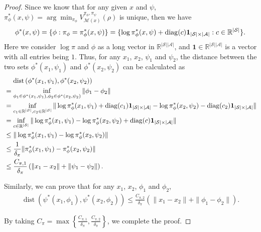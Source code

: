 \documentclass{article}
\theoremstyle{plain}
\theoremstyle{definition}
\theoremstyle{remark}
\DeclareMathOperator{\dist}{dist}
\def\R{\mathbb R}
\def\cA{\mathcal A}
\def\cM{\mathcal M}
\def\cS{\mathcal S}
\DeclareMathOperator{\diag}{diag}
\begin{document}
\begin{proof}
    Since we know that for any given $x$ and $\psi$, $\pi_\phi^*(x,\psi) = \arg\min_{\pi_\phi} V^{\pi_\phi,\pi_\psi}_{\cM(x)}(\rho)$ is unique, then we have
    \begin{align}
        \phi^*(x,\psi) = \{\phi: \pi_\phi = \pi_\phi^*(x,\psi) \} = \{\log \pi_\phi^*(x,\psi) + 
        \diag(c) \mathbf{1}_{|\cS| \times |\cA|}: c\in \R^{|\cS|}\}. \notag
    \end{align}
    Here we consider $\log \pi$ and $\phi$ as a long vector in $\R^{|\cS||\cA|}$, and $\mathbf{1} \in \R^{|\cS||\cA|}$ is a vector with all entries being $1$.
    Thus, for any $x_1$, $x_2$, $\psi_1$ and $\psi_2$, the distance between the two sets $\phi^*(x_1,\psi_1)$ and $\phi^*(x_2,\psi_2)$ can be calculated as
    \begin{align}
        & \quad \, \dist \left(\phi^*(x_1,\psi_1), \phi^*(x_2,\psi_2)\right) \notag \\
        & = \inf_{\phi_1 \in \phi^*(x_1,\psi_1), \phi_2 \in \phi^*(x_2,\psi_2)} \| \phi_1 - \phi_2 \| \notag\\
        & = \inf_{c_1 \in \R^{|\cS|}, c_2 \in \R^{|\cS|}} \| \log \pi_\phi^*(x_1,\psi_1) + \diag(c_1) \mathbf{1}_{|\cS| \times |\cA|} - \log \pi_\phi^*(x_2,\psi_2) - \diag(c_2) \mathbf{1}_{|\cS| \times |\cA|} \| \notag\\
        & = \inf_{c \in \R^{|\cS|}} \| \log \pi_\phi^*(x_1,\psi_1) - \log \pi_\phi^*(x_2,\psi_2) + \diag(c) \mathbf{1}_{|\cS| \times |\cA|} \| \notag\\
        & \leq \| \log \pi_\phi^*(x_1,\psi_1) - \log \pi_\phi^*(x_2,\psi_2) \| \notag\\
        & \leq \frac{1}{\delta_\pi} \| \pi_\phi^*(x_1,\psi_1) - \pi_\phi^*(x_2,\psi_2) \| \notag\\
        & \leq \frac{C_{\pi,1}}{\delta_\pi} \left( \| x_1 - x_2 \| + \| \psi_1 - \psi_2 \| \right).
    \end{align}

    Similarly, we can prove that for any $x_1$, $x_2$, $\phi_1$ and $\phi_2$,
    \begin{align}
        \operatorname{dist} \left(\psi^*(x_1,\phi_1), \psi^*(x_2,\phi_2)\right)  \leq \frac{C_{\pi,2}}{\delta_\pi} \left( \| x_1 - x_2 \| + \| \phi_1 - \phi_2 \| \right).
    \end{align}

    By taking $C_{\pi} = \max\left\{\frac{C_{\pi,1}}{\delta_\pi}, \frac{C_{\pi,2}}{\delta_\pi}\right\}$, we complete the proof.
\end{proof}
\end{document}
